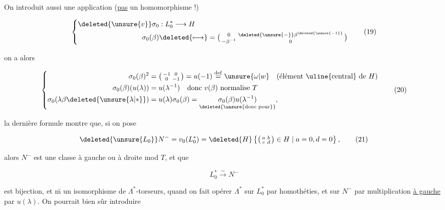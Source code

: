 
On introduit aussi une application (\uline{pas} un homomorphisme !)

\[
\left\{\begin{aligned}
 \deleted{\unsure{v}}\sigma_0 &:L_0^*\longrightarrow H\\
 \sigma_0(\beta)&\deleted{\longmapsto}=\bigl(\begin{smallmatrix}0&\deleted{\unsure{-}}\beta^{\deleted{\unsure{-1}}}\\-\beta^{-1}&0\end{smallmatrix}\bigr)
\end{aligned}\right.\tag*{(19)}
\]


on a alors

\[
\left\{\begin{aligned}
 \sigma_0(\beta)^2&=\bigl(\begin{smallmatrix}-1&0\\0&-1\end{smallmatrix}\bigr)=u(-1)\overset{\mathrm{def}}{=}\unsure{\omega|w}
 \quad\text{(élément \uline{central} de $H$)}\\
 \sigma_0(\beta)(u(\lambda))&=u(\lambda^{-1})\quad\text{donc }v(\beta)\text{ normalise }T\\
 \sigma_0(\lambda\beta\deleted{\unsure{\lambda|*}})&=u(\lambda)\sigma_0(\beta)
 =\underset{\deleted{\text{\unsure{donc pour}}}}{\sigma_0(\beta)u(\lambda^{-1})},
\end{aligned}\right.\tag*{(20)}
\]

la dernière formule montre que, si on pose

\[
\deleted{\unsure{L_0}}N^-=v_0(L_0^*)=\deleted{H}\left\{\bigl(\begin{smallmatrix}a&b\\c&d\end{smallmatrix}\bigr)\in H\mid a=0,d=0\right\},\tag*{(21)}
\]

alors $N^-$ est une classe à gauche ou à droite mod $T$, et que

\[
L_0^*\xrightarrow{\sim}N^-\tag*{(22)}
\]

est bijection, et \={m} un isomorphisme de $\Lambda^*$-torseurs, quand on fait opérer $\Lambda^*$ sur $L_0^*$ par homothéties, et sur $N^-$ par multiplication \uline{à gauche} par $u(\lambda)$. On pourrait bien sûr introduire  

